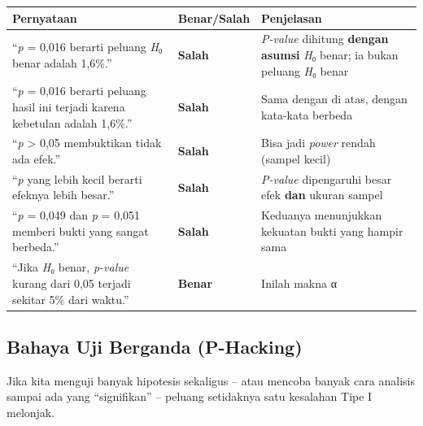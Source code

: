 \documentclass[
  indonesian,
  letterpaper,
]{book}
\newcounter{none} %
\begin{document}
{\def\LTcaptype{none} %
\begin{longtable}[]{@{}
  >{\raggedright\arraybackslash}p{}
  >{\raggedright\arraybackslash}p{}
  >{\raggedright\arraybackslash}p{}@{}}
\toprule\noalign{}
\begin{minipage}[b]{\linewidth}\raggedright
Pernyataan
\end{minipage} & \begin{minipage}[b]{\linewidth}\raggedright
Benar/Salah
\end{minipage} & \begin{minipage}[b]{\linewidth}\raggedright
Penjelasan
\end{minipage} \\
\midrule\noalign{}
\endhead
\bottomrule\noalign{}
\endlastfoot
``\emph{p} = 0,016 berarti peluang \emph{H}₀ benar adalah 1,6\%.'' &
\textbf{Salah} & \emph{P-value} dihitung \textbf{dengan asumsi}
\emph{H}₀ benar; ia bukan peluang \emph{H}₀ benar \\
``\emph{p} = 0,016 berarti peluang hasil ini terjadi karena kebetulan
adalah 1,6\%.'' & \textbf{Salah} & Sama dengan di atas, dengan kata-kata
berbeda \\
``\emph{p} \textgreater{} 0,05 membuktikan tidak ada efek.'' &
\textbf{Salah} & Bisa jadi \emph{power} rendah (sampel kecil) \\
``\emph{p} yang lebih kecil berarti efeknya lebih besar.'' &
\textbf{Salah} & \emph{P-value} dipengaruhi besar efek \textbf{dan}
ukuran sampel \\
``\emph{p} = 0,049 dan \emph{p} = 0,051 memberi bukti yang sangat
berbeda.'' & \textbf{Salah} & Keduanya menunjukkan kekuatan bukti yang
hampir sama \\
``Jika \emph{H}₀ benar, \emph{p-value} kurang dari 0,05 terjadi sekitar
5\% dari waktu.'' & \textbf{Benar} & Inilah makna α \\
\end{longtable}
}

\subsection{Bahaya Uji Berganda
(P-Hacking)}\label{bahaya-uji-berganda-p-hacking}

Jika kita menguji banyak hipotesis sekaligus -- atau mencoba banyak cara
analisis sampai ada yang ``signifikan'' -- peluang setidaknya satu
kesalahan Tipe I melonjak.
\end{document}
